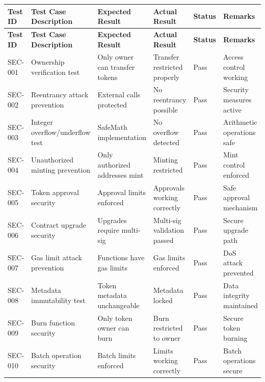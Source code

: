 \documentclass[oneside,a4paper,12pt]{book}
\begin{document}
\begin{longtable}{|p{1.5cm}|p{3.5cm}|p{2.8cm}|p{2.5cm}|p{1.8cm}|p{2.3cm}|}
\hline
\textbf{Test ID} & \textbf{Test Case Description} & \textbf{Expected Result} & \textbf{Actual Result} & \textbf{Status} & \textbf{Remarks} \\
\hline
\endfirsthead

\hline
\textbf{Test ID} & \textbf{Test Case Description} & \textbf{Expected Result} & \textbf{Actual Result} & \textbf{Status} & \textbf{Remarks} \\
\hline
\endhead

SEC-001 & Ownership verification test & Only owner can transfer tokens & Transfer restricted properly & Pass & Access control working \\
\hline

SEC-002 & Reentrancy attack prevention & External calls protected & No reentrancy possible & Pass & Security measures active \\
\hline

SEC-003 & Integer overflow/underflow test & SafeMath implementation & No overflow detected & Pass & Arithmetic operations safe \\
\hline

SEC-004 & Unauthorized minting prevention & Only authorized addresses mint & Minting restricted & Pass & Mint control enforced \\
\hline

SEC-005 & Token approval security & Approval limits enforced & Approvals working correctly & Pass & Safe approval mechanism \\
\hline

SEC-006 & Contract upgrade security & Upgrades require multi-sig & Multi-sig validation passed & Pass & Secure upgrade path \\
\hline

SEC-007 & Gas limit attack prevention & Functions have gas limits & Gas limits enforced & Pass & DoS attack prevented \\
\hline

SEC-008 & Metadata immutability test & Token metadata unchangeable & Metadata locked & Pass & Data integrity maintained \\
\hline

SEC-009 & Burn function security & Only token owner can burn & Burn restricted to owner & Pass & Secure token burning \\
\hline

SEC-010 & Batch operation security & Batch limits enforced & Limits working correctly & Pass & Batch operations secure \\
\hline


\end{longtable}
\end{document}

